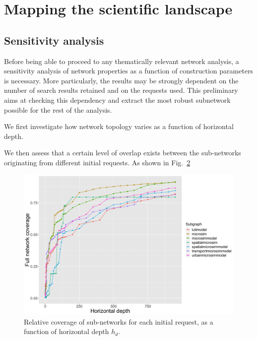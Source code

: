\section*{Mapping the scientific landscape}

\subsection*{Sensitivity analysis}


Before being able to proceed to any thematically relevant network analysis, a sensitivity analysis of network properties as a function of construction parameters is necessary. More particularly, the results may be strongly dependent on the number of search results retained and on the requests used. This preliminary aims at checking this dependency and extract the most robust subnetwork possible for the rest of the analysis.

We first investigate how network topology varies as a function of horizontal depth.


\begin{figure}
    \centering
    \caption{}
    \label{fig:modularity-hdepth}
\end{figure}


We then assess that a certain level of overlap exists between the sub-networks originating from different initial requests. As shown in Fig.~\ref{fig:coverage-hdepth}

\begin{figure}
    \centering
    \includegraphics{figures/coveragesubnws.png}
    \caption{Relative coverage of sub-networks for each initial request, as a function of horizontal depth $h_d$.}
    \label{fig:coverage-hdepth}
\end{figure}


